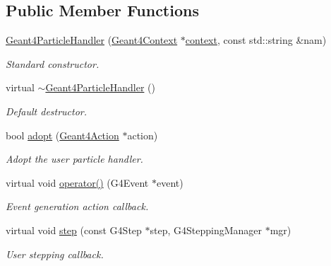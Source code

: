 \subsection*{Public Member Functions}
\begin{DoxyCompactItemize}
\item 
\hyperlink{class_d_d4hep_1_1_simulation_1_1_geant4_particle_handler_a73b0d7c5a9dc15fd03ca4993382d6795}{Geant4\+Particle\+Handler} (\hyperlink{class_d_d4hep_1_1_simulation_1_1_geant4_context}{Geant4\+Context} $\ast$\hyperlink{class_d_d4hep_1_1_simulation_1_1_geant4_action_aa9d87f0ec2a72b7fc2591b18f98d75cf}{context}, const std\+::string \&nam)
\begin{DoxyCompactList}\small\item\em Standard constructor. \end{DoxyCompactList}\item 
virtual \hyperlink{class_d_d4hep_1_1_simulation_1_1_geant4_particle_handler_a38b97e54b48b0df16a7205a683a68180}{$\sim$\+Geant4\+Particle\+Handler} ()
\begin{DoxyCompactList}\small\item\em Default destructor. \end{DoxyCompactList}\item 
bool \hyperlink{class_d_d4hep_1_1_simulation_1_1_geant4_particle_handler_a2f69aadfffab73e1fb98f5cd3a1e3ebb}{adopt} (\hyperlink{class_d_d4hep_1_1_simulation_1_1_geant4_action}{Geant4\+Action} $\ast$action)
\begin{DoxyCompactList}\small\item\em Adopt the user particle handler. \end{DoxyCompactList}\item 
virtual void \hyperlink{class_d_d4hep_1_1_simulation_1_1_geant4_particle_handler_a239e9338d41588f5dcfc3ea012aba02a}{operator()} (G4\+Event $\ast$event)
\begin{DoxyCompactList}\small\item\em Event generation action callback. \end{DoxyCompactList}\item 
virtual void \hyperlink{class_d_d4hep_1_1_simulation_1_1_geant4_particle_handler_abb534226cfb8d022077d48681226a179}{step} (const G4\+Step $\ast$step, G4\+Stepping\+Manager $\ast$mgr)
\begin{DoxyCompactList}\small\item\em User stepping callback. \end{DoxyCompactList}\item 

\end{DoxyCompactItemize}
